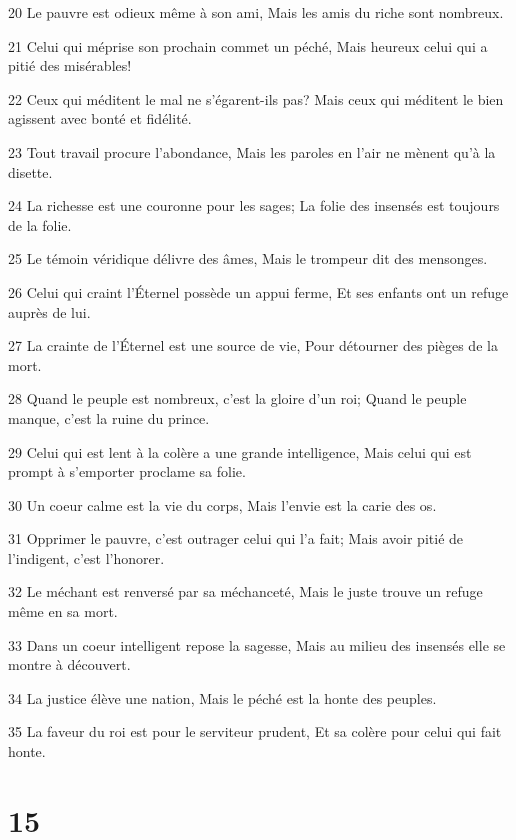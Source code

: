 \par 20 Le pauvre est odieux même à son ami, Mais les amis du riche sont nombreux.
\par 21 Celui qui méprise son prochain commet un péché, Mais heureux celui qui a pitié des misérables!
\par 22 Ceux qui méditent le mal ne s'égarent-ils pas? Mais ceux qui méditent le bien agissent avec bonté et fidélité.
\par 23 Tout travail procure l'abondance, Mais les paroles en l'air ne mènent qu'à la disette.
\par 24 La richesse est une couronne pour les sages; La folie des insensés est toujours de la folie.
\par 25 Le témoin véridique délivre des âmes, Mais le trompeur dit des mensonges.
\par 26 Celui qui craint l'Éternel possède un appui ferme, Et ses enfants ont un refuge auprès de lui.
\par 27 La crainte de l'Éternel est une source de vie, Pour détourner des pièges de la mort.
\par 28 Quand le peuple est nombreux, c'est la gloire d'un roi; Quand le peuple manque, c'est la ruine du prince.
\par 29 Celui qui est lent à la colère a une grande intelligence, Mais celui qui est prompt à s'emporter proclame sa folie.
\par 30 Un coeur calme est la vie du corps, Mais l'envie est la carie des os.
\par 31 Opprimer le pauvre, c'est outrager celui qui l'a fait; Mais avoir pitié de l'indigent, c'est l'honorer.
\par 32 Le méchant est renversé par sa méchanceté, Mais le juste trouve un refuge même en sa mort.
\par 33 Dans un coeur intelligent repose la sagesse, Mais au milieu des insensés elle se montre à découvert.
\par 34 La justice élève une nation, Mais le péché est la honte des peuples.
\par 35 La faveur du roi est pour le serviteur prudent, Et sa colère pour celui qui fait honte.

\chapter{15}

